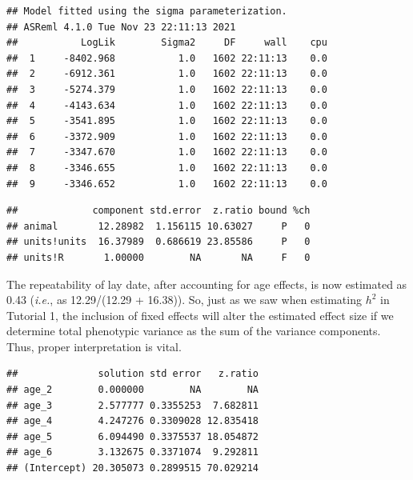 \documentclass[
  12pt,
]{book}
\newenvironment{Shaded}{\begin{snugshade}}{\end{snugshade}}
\newcommand{\DataTypeTok}[1]{\textcolor[rgb]{0.13,0.29,0.53}{#1}}
\newcommand{\KeywordTok}[1]{\textcolor[rgb]{0.13,0.29,0.53}{\textbf{#1}}}
\newcommand{\NormalTok}[1]{#1}
\newcommand{\OperatorTok}[1]{\textcolor[rgb]{0.81,0.36,0.00}{\textbf{#1}}}
\newcommand{\OtherTok}[1]{\textcolor[rgb]{0.56,0.35,0.01}{#1}}
\begin{document}
\begin{verbatim}
## Model fitted using the sigma parameterization.
## ASReml 4.1.0 Tue Nov 23 22:11:13 2021
##           LogLik        Sigma2     DF     wall    cpu
##  1     -8402.968           1.0   1602 22:11:13    0.0
##  2     -6912.361           1.0   1602 22:11:13    0.0
##  3     -5274.379           1.0   1602 22:11:13    0.0
##  4     -4143.634           1.0   1602 22:11:13    0.0
##  5     -3541.895           1.0   1602 22:11:13    0.0
##  6     -3372.909           1.0   1602 22:11:13    0.0
##  7     -3347.670           1.0   1602 22:11:13    0.0
##  8     -3346.655           1.0   1602 22:11:13    0.0
##  9     -3346.652           1.0   1602 22:11:13    0.0
\end{verbatim}

\begin{Shaded}
\end{Shaded}

\begin{verbatim}
##             component std.error  z.ratio bound %ch
## animal       12.28982  1.156115 10.63027     P   0
## units!units  16.37989  0.686619 23.85586     P   0
## units!R       1.00000        NA       NA     F   0
\end{verbatim}

The repeatability of lay date, after accounting for age effects, is now estimated as 0.43 (\emph{i.e.}, as 12.29/(12.29 + 16.38)).
So, just as we saw when estimating \(h^2\) in Tutorial 1, the inclusion of fixed effects will alter the estimated effect size if we determine total phenotypic variance as the sum of the variance components. Thus, proper interpretation is vital.

\begin{Shaded}
\end{Shaded}

\begin{verbatim}
##              solution std error   z.ratio
## age_2        0.000000        NA        NA
## age_3        2.577777 0.3355253  7.682811
## age_4        4.247276 0.3309028 12.835418
## age_5        6.094490 0.3375537 18.054872
## age_6        3.132675 0.3371074  9.292811
## (Intercept) 20.305073 0.2899515 70.029214
\end{verbatim}
\end{document}
